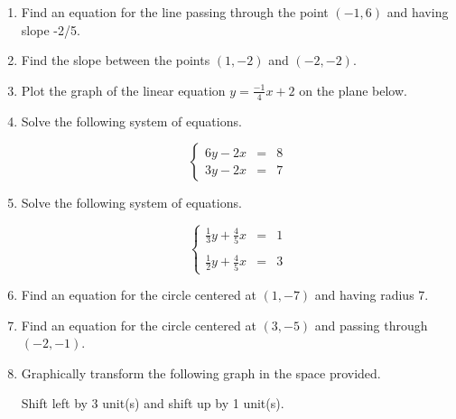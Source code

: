 \documentclass{article}
\begin{document}
\ReviewTitle[class={College Algebra}, for={Test 2}]

\begin{enumerate}
\item Find an equation for the line passing through the point $(-1, 6)$ and having slope -2/5. \vspace{5cm}

\item Find the slope between the points $(1, -2)$ and $(-2, -2)$. \vspace{5cm}

\item Plot the graph of the linear equation $y = \frac{-1}{4} x + 2$ on the plane below.\begin{center}
\CartesianPlane[h=7,w=7,axes=yes]
\end{center}

  

\newpage

\item Solve the following system of equations.

\[ \left\{ \begin{array}{rcl} 6y - 2x & = & 8 \\ 3y - 2x & = & 7 \end{array} \right. \] \vspace{5cm}

\item Solve the following system of equations.

\[ \left\{ \begin{array}{rcl} \frac{1}{3}y + \frac{4}{5}x & = & 1 \\ & & \\ \frac{1}{2}y + \frac{4}{5}x & = & 3 \end{array} \right. \] \vspace{5cm}

\item Find an equation for the circle centered at $(1, -7)$ and having radius $7$. \vspace{2cm}

\item Find an equation for the circle centered at $(3, -5)$ and passing through $(-2, -1)$. \vspace{5cm}

\newpage

\item Graphically transform the following graph in the space provided.

\begin{center}
Shift left by 3 unit(s) and shift up by 1 unit(s).
\end{center}


\end{enumerate}
\end{document}
